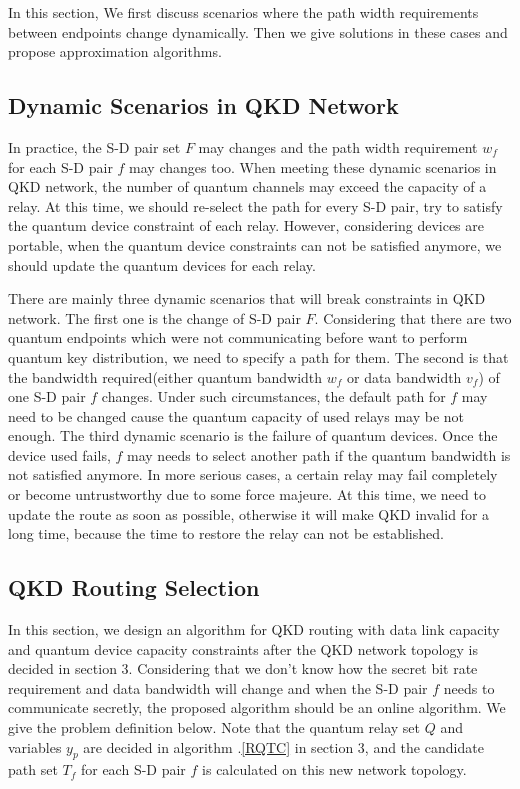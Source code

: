In this section, We first discuss scenarios where the path width requirements between endpoints change dynamically. Then we give solutions in these cases and propose approximation algorithms.
\subsection{Dynamic Scenarios in QKD Network}
In practice, the S-D pair set $F$ may changes and the path width requirement $w_f$ for each S-D pair $f$ may changes too. When meeting these dynamic scenarios in QKD network, the number of quantum channels may exceed the capacity of a relay. At this time, we should re-select the path for every S-D pair, try to satisfy the quantum device constraint of each relay. However, considering devices are portable, when the quantum device constraints can not be satisfied anymore, we should update the quantum devices for each relay.


There are mainly three dynamic scenarios that will break constraints in QKD network. The first one is the change of S-D pair $F$. Considering that there are two quantum endpoints which were not communicating before want to perform quantum key distribution, we need to specify a path for them. The second is that the bandwidth required(either quantum bandwidth $w_f$ or data bandwidth $v_f$) of one S-D pair $f$ changes. Under such circumstances, the default path for $f$ may need to be changed cause the quantum capacity of used relays may be not enough. The third dynamic scenario is the failure of quantum devices. Once the device used fails, $f$ may needs to select another path if the quantum bandwidth is not satisfied anymore. In more serious cases, a certain relay may fail completely or become untrustworthy due to some force majeure. At this time, we need to update the route as soon as possible, otherwise it will make QKD invalid for a long time, because the time to restore the relay can not be established.



\subsection{QKD Routing Selection}
In this section, we design an algorithm for QKD routing with data link capacity and quantum device capacity constraints after the QKD network topology is decided in section 3. Considering that we don't know how the secret bit rate requirement and data bandwidth will change and when the S-D pair $f$ needs to communicate secretly, the proposed algorithm should be an online algorithm. 
We give the problem definition below. Note that the quantum relay set $Q$ and variables $y_p$ are decided in algorithm .\ref{RQTC} in section 3, and the candidate path set $T_f$ for each S-D pair $f$ is calculated on this new network topology.


